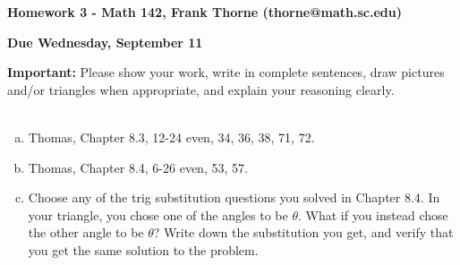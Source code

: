 \documentclass[12pt]{article}
\begin{document}
\setlength{\topmargin}{-2mm}





\begin{center}{\bf Homework 3 - Math 142, Frank Thorne (thorne@math.sc.edu)}
\end{center}
\begin{center}
{\bf Due Wednesday, September 11}
\end{center}

{\bf Important:} 
Please show your work, write in complete sentences, draw pictures and/or triangles when appropriate, and explain your reasoning clearly. 
\\
\\

\begin{enumerate}[(a)]
\item
Thomas, Chapter 8.3, 12-24 even, 34, 36, 38, 71, 72.

\item
Thomas, Chapter 8.4, 6-26 even, 53, 57.

\item
Choose any of the trig substitution questions you solved in Chapter 8.4. In your triangle, you chose one of the angles to be $\theta$. 
What if you instead chose the other angle to be $\theta$? Write down the substitution you get, and verify that you get the same solution
to the problem.

\end{enumerate}
\end{document}
